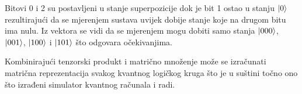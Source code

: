 Bitovi 0 i 2 su postavljeni u stanje superpozicije dok je bit 1 ostao u stanju $\ket{0}$ rezultirajući da se mjerenjem sustava uvijek dobije stanje koje na drugom bitu ima nulu. Iz vektora se vidi da se mjerenjem mogu dobiti samo stanja $\ket{000}$, $\ket{001}$, $\ket{100}$ i $\ket{101}$ što odgovara očekivanjima.

Kombinirajući tenzorski produkt i matrično množenje može se izračunati matrična reprezentacija svakog kvantnog logičkog kruga što je u suštini točno ono što izrađeni simulator kvantnog računala i radi.



